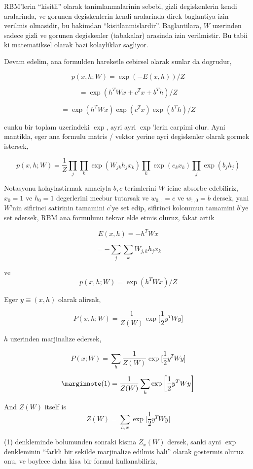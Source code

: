 \documentclass[12pt,fleqn]{article}\usepackage{../common}
\begin{document}
RBM'lerin ``kisitli'' olarak tanimlanmalarinin sebebi, gizli degiskenlerin
kendi aralarinda, ve gorunen degiskenlerin kendi aralarinda direk
baglantiya izin verilmis olmasidir, bu bakimdan
``kisitlanmislardir''. Baglantilara, $W$ uzerinden sadece gizli ve gorunen
degiskenler (tabakalar) arasinda izin verilmistir. Bu tabii ki matematiksel
olarak bazi kolayliklar sagliyor.

Devam edelim, ana formulden hareketle cebirsel olarak sunlar da dogrudur,

$$ p(x,h;W) = \exp (-E(x,h)) / Z $$

$$ = \exp (h^TWx + c^Tx + b^Th ) / Z $$

$$ = \exp (h^TWx) \exp (c^Tx) \exp(b^Th) / Z $$

cunku bir toplam uzerindeki $\exp$, ayri ayri $\exp$'lerin carpimi
olur. Ayni mantikla, eger ana formulu matris / vektor yerine ayri
degiskenler olarak gormek istersek,

$$ 
p(x,h;W) = \frac{1}{Z}
\prod_j \prod_k \exp (W_{jk}h_jx_k) \prod_k \exp(c_kx_k) \prod_j \exp(b_jh_j) 
 $$

Notasyonu kolaylastirmak amaciyla $b,c$ terimlerini $W$ icine absorbe
edebiliriz, $x_0=1$ ve $h_0=1$ degerlerini mecbur tutarsak ve $w_{0,:}=c$
ve $w_{:,0}=b$ dersek, yani $W$'nin sifirinci satirinin tamamini $c$'ye set
edip, sifirinci kolonunun tamamini $b$'ye set edersek, RBM ana formulunu
tekrar elde etmis oluruz, fakat artik 

$$ E(x,h) = -h^TWx $$


$$ = - \sum_j \sum_k W_{j,k}h_jx_k  $$

ve
$$ p(x,h;W)  = \exp (h^TWx) / Z $$


Eger $y \equiv (x,h)$ olarak alirsak, 


$$ P(x,h;W) = \frac{1}{Z(W)} \exp 
\bigg[ 
\frac{1}{2} y^T W y
\bigg]
$$

$h$ uzerinden marjinalize edersek,

$$ P(x;W) = \sum_h \frac{1}{Z(W)} \exp 
\bigg[ 
\frac{1}{2} y^T W y
\bigg]
$$


$$  
\mlabel{1}
= \frac{1}{Z(W)}  \sum_h \exp 
\bigg[ 
\frac{1}{2} y^T W y
\bigg]
$$


And $Z(W)$ itself is
$$ Z(W) = \sum_{h,x} \exp 
\bigg[ 
\frac{1}{2} y^T W y
\bigg]
$$

(1) denkleminde bolumunden sonraki kisma $Z_x(W)$ dersek, sanki ayni $\exp$
denkleminin ``farkli bir sekilde marjinalize edilmis hali'' olarak
gostermis oluruz onu, ve boylece daha kisa bir formul kullanabiliriz,
\end{document}
